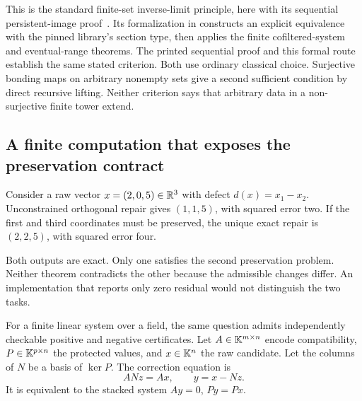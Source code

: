 This is the standard finite-set inverse-limit principle, here with its sequential persistent-image proof~\cite{KS:stacks-limits}. Its formalization in  constructs an explicit equivalence with the pinned library's section type, then applies the finite cofiltered-system and eventual-range theorems. The printed sequential proof and this formal route establish the same stated criterion. Both use ordinary classical choice. Surjective bonding maps on arbitrary nonempty sets give a second sufficient condition by direct recursive lifting. Neither criterion says that arbitrary data in a non-surjective finite tower extend.

\subsection{A finite computation that exposes the preservation contract}
Consider a raw vector \(x=(2,0,5)\in\mathbb R^3\) with defect \(d(x)=x_1-x_2\). Unconstrained orthogonal repair gives \((1,1,5)\), with squared error two. If the first and third coordinates must be preserved, the unique exact repair is \((2,2,5)\), with squared error four.

Both outputs are exact. Only one satisfies the second preservation problem. Neither theorem contradicts the other because the admissible changes differ. An implementation that reports only zero residual would not distinguish the two tasks.

For a finite linear system over a field, the same question admits independently checkable positive and negative certificates. Let \(A\in\mathbb K^{m\times n}\) encode compatibility, \(P\in\mathbb K^{p\times n}\) the protected values, and \(x\in\mathbb K^n\) the raw candidate. Let the columns of \(N\) be a basis of \(\ker P\). The correction equation is
\[
 ANz=Ax,\qquad y=x-Nz.
\]
It is equivalent to the stacked system \(Ay=0\), \(Py=Px\).

